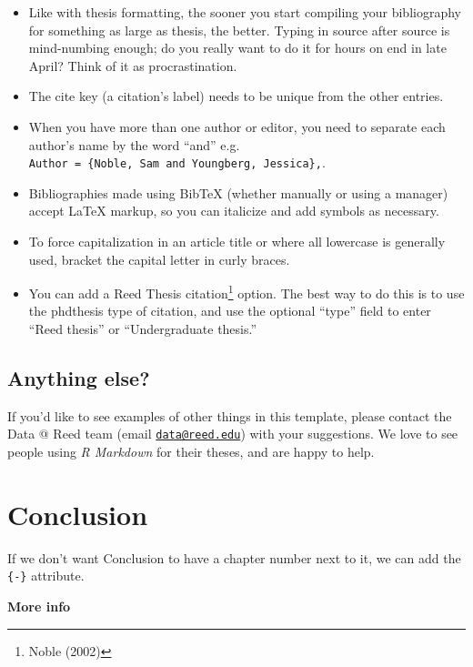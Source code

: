 \documentclass[12pt,twoside]{reedthesis}
\providecommand{\tightlist}{%
  \setlength{\itemsep}{0pt}\setlength{\parskip}{0pt}}
\begin{document}
  \begin{itemize}
  \tightlist
  \item
    Like with thesis formatting, the sooner you start compiling your
    bibliography for something as large as thesis, the better. Typing in
    source after source is mind-numbing enough; do you really want to do
    it for hours on end in late April? Think of it as procrastination.
  \item
    The cite key (a citation's label) needs to be unique from the other
    entries.
  \item
    When you have more than one author or editor, you need to separate
    each author's name by the word ``and'' e.g.
    \texttt{Author\ =\ \{Noble,\ Sam\ and\ Youngberg,\ Jessica\},}.
  \item
    Bibliographies made using BibTeX (whether manually or using a manager)
    accept LaTeX markup, so you can italicize and add symbols as
    necessary.
  \item
    To force capitalization in an article title or where all lowercase is
    generally used, bracket the capital letter in curly braces.
  \item
    You can add a Reed Thesis citation\footnote{Noble (2002)} option. The
    best way to do this is to use the phdthesis type of citation, and use
    the optional ``type'' field to enter ``Reed thesis'' or
    ``Undergraduate thesis.''
  \end{itemize}
  
  \section{Anything else?}\label{anything-else}
  
  If you'd like to see examples of other things in this template, please
  contact the Data @ Reed team (email
  \href{mailto:data@reed.edu}{\nolinkurl{data@reed.edu}}) with your
  suggestions. We love to see people using \emph{R Markdown} for their
  theses, and are happy to help.
  
  \chapter*{Conclusion}\label{conclusion}
  
  If we don't want Conclusion to have a chapter number next to it, we can
  add the \texttt{\{-\}} attribute.
  
  \textbf{More info}
  
\end{document}
